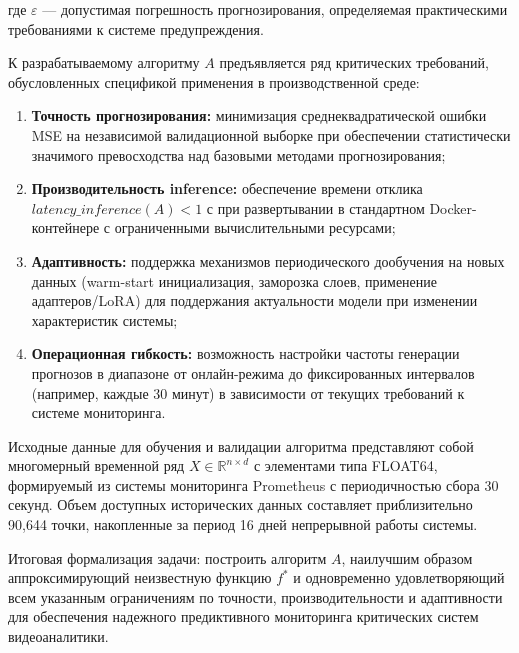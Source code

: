 где $\varepsilon$ --- допустимая погрешность прогнозирования, определяемая практическими требованиями к системе предупреждения.

\hspace*{1.25cm}К разрабатываемому алгоритму $A$ предъявляется ряд критических требований, обусловленных спецификой применения в производственной среде:

\begin{enumerate}
	\item \textbf{Точность прогнозирования:} минимизация среднеквадратической ошибки MSE на независимой валидационной выборке при обеспечении статистически значимого превосходства над базовыми методами прогнозирования;
	\item \textbf{Производительность inference:} обеспечение времени отклика \\$latency\_inference(A) < 1$ с при развертывании в стандартном Docker-контейнере с ограниченными вычислительными ресурсами;
	\item \textbf{Адаптивность:} поддержка механизмов периодического дообучения на новых данных (warm-start инициализация, заморозка слоев, применение адаптеров/LoRA) для поддержания актуальности модели при изменении характеристик системы;
	\item \textbf{Операционная гибкость:} возможность настройки частоты генерации прогнозов в диапазоне от онлайн-режима до фиксированных интервалов (например, каждые 30 минут) в зависимости от текущих требований к системе мониторинга.
\end{enumerate}

\hspace*{1.25cm}Исходные данные для обучения и валидации алгоритма представляют собой многомерный временной ряд $X \in \mathbb{R}^{n \times d}$ с элементами типа FLOAT64, формируемый из системы мониторинга Prometheus с периодичностью сбора 30 секунд. Объем доступных исторических данных составляет приблизительно 90,644 точки, накопленные за период 16 дней непрерывной работы системы.

\hspace*{1.25cm}Итоговая формализация задачи: построить алгоритм $A$, наилучшим образом аппроксимирующий неизвестную функцию $f^*$ и одновременно удовлетворяющий всем указанным ограничениям по точности, производительности и адаптивности для обеспечения надежного предиктивного мониторинга критических систем видеоаналитики.

